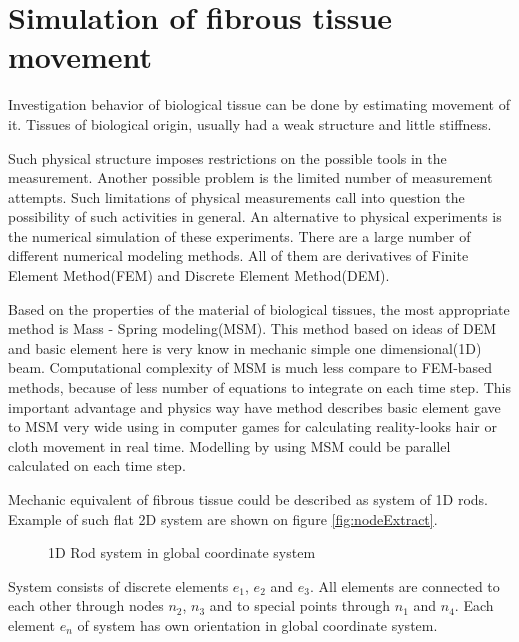 \chapter*{Simulation of fibrous tissue movement} 
Investigation behavior of biological tissue can be done by estimating movement of it. Tissues of
biological origin, usually had a weak structure and little stiffness.
\par
Such physical structure imposes restrictions on the possible tools in the measurement. Another
possible problem is the limited number of measurement attempts. Such limitations of physical
measurements call into question the possibility of such activities in general. An alternative to
physical experiments is the numerical simulation of these experiments. There are a large number of
different numerical modeling methods. All of them are derivatives of Finite Element Method(FEM) and
Discrete Element Method(DEM).
\par
Based on the properties of the material of biological tissues, the most appropriate method is Mass -
Spring modeling(MSM). This method based on ideas of DEM and basic element here is very know in
mechanic simple one dimensional(1D) beam.
Computational complexity of MSM is much less compare to FEM-based methods, because of less number of
equations to integrate on each time step. This important advantage and physics way have method
describes basic element gave to MSM very wide using in computer games for calculating reality-looks
hair or cloth movement in real time. Modelling by using MSM could be parallel calculated on each
time step.\cite{Rasmusson2008} \cite{Amorim2012}
\par
Mechanic equivalent of fibrous tissue could be described as system of 1D rods. Example of such flat
2D system are shown on figure \ref{fig:nodeExtract}.
\begin{figure}[ht]
  \centering
      
  \caption{1D Rod system in global coordinate system}\label{fig:rodSystem}      
\end{figure} 
System consists of discrete elements $e_1$, $e_2$ and $e_3$. All elements are connected to each
other through nodes $n_2$, $n_3$ and to special points through $n_1$ and $n_4$. Each element $e_n$
of system has own orientation in global coordinate system. 
